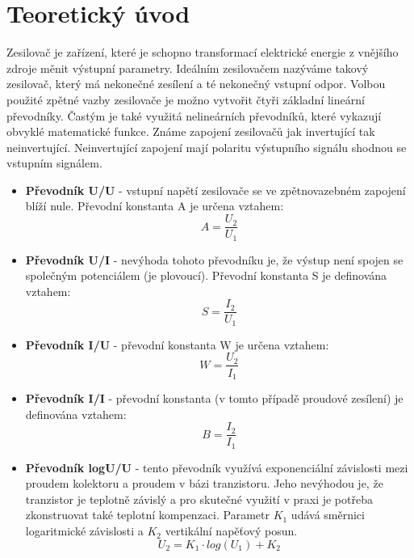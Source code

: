 \documentclass[a4paper, czech]{article}
\begin{document}
\section{Teoretický úvod}

Zesilovač je zařízení, které je schopno transformací elektrické energie z vnějšího zdroje měnit výstupní parametry.
Ideálním zesilovačem nazýváme takový zesilovač, který má nekonečné zesílení a té nekonečný vstupní odpor.
Volbou použité zpětné vazby zesilovače je možno vytvořit čtyři základní lineární převodníky.
Častým je také využitá nelineárních převodníků, které vykazují obvyklé matematické funkce.
Známe zapojení zesilovačů jak invertující tak neinvertující. Neinvertující zapojení mají polaritu výstupního signálu shodnou se vstupním signálem.

\begin{itemize}
    \item \textbf{Převodník U/U} - vstupní napětí zesilovače se ve zpětnovazebném zapojení blíží nule. Převodní konstanta A je určena vztahem:
    \begin{equation*}
        A = \frac{U_2}{U_1}
    \end{equation*}

    \item \textbf{Převodník U/I} - nevýhoda tohoto převodníku je, že výstup není spojen se společným potenciálem (je plovoucí). Převodní konstanta S je definována vztahem:
    \begin{equation*}
        S = \frac{I_2}{U_1}
    \end{equation*}

    \item \textbf{Převodník I/U} - převodní konstanta W je určena vztahem:
    \begin{equation*}
        W = \frac{U_2}{I_1}
    \end{equation*}

    \item \textbf{Převodník I/I} - převodní konstanta (v tomto případě proudové zesílení) je definována vztahem:
    \begin{equation*}
        B = \frac{I_2}{I_1}
    \end{equation*}

    \item \textbf{Převodník logU/U} - tento převodník využívá exponenciální závislosti mezi proudem kolektoru a proudem v bázi tranzistoru. Jeho nevýhodou je, že tranzistor je teplotně závislý a pro skutečné využití v praxi je potřeba zkonstruovat také teplotní kompenzaci. Parametr $K_1$ udává směrnici logaritmické závislosti a $K_2$ vertikální napěťový posun.
    \begin{equation*}
        U_2 = K_1 \cdot log (U_1) + K_2
    \end{equation*}
\end{itemize}
\end{document}
